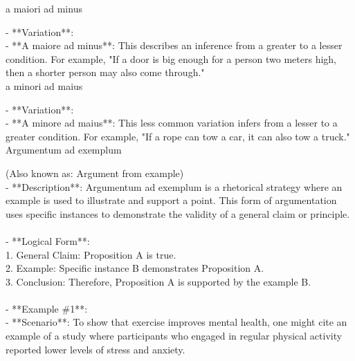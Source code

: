 \documentclass[a4paper,12pt,single,pdftex]{scrartcl}
\begin{document}
a maiori ad minus
    
      - **Variation**:
    \\

    
        - **A maiore ad minus**: This describes an inference from a greater to a lesser condition. For example, "If a door is big enough for a person two meters high, then a shorter person may also come through."
    \\

  

a minori ad maius
    
      - **Variation**:
    \\

    
        - **A minore ad maius**: This less common variation infers from a lesser to a greater condition. For example, "If a rope can tow a car, it can also tow a truck."
    \\

  

Argumentum ad exemplum
    
      (Also known as: Argument from example)
    \\

  
    
      - **Description**: Argumentum ad exemplum is a rhetorical strategy where an example is used to illustrate and support a point. This form of argumentation uses specific instances to demonstrate the validity of a general claim or principle.
    \\

    
      
    \\

    
      - **Logical Form**:
    \\

    
        1. General Claim: Proposition A is true.
    \\

    
        2. Example: Specific instance B demonstrates Proposition A.
    \\

    
        3. Conclusion: Therefore, Proposition A is supported by the example B.
    \\

    
      
    \\

    
      - **Example \#1**:
    \\

    
        - **Scenario**: To show that exercise improves mental health, one might cite an example of a study where participants who engaged in regular physical activity reported lower levels of stress and anxiety.
    \\
\end{document}
